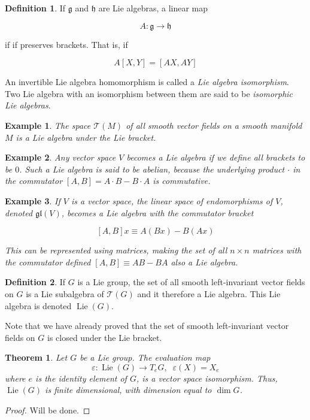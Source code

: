 \documentclass{article}
\DeclareMathOperator{\Lie}{Lie}
\newtheorem{theorem}{Theorem}[section]
\newtheorem{example}{Example}[section]
\theoremstyle{remark}
\theoremstyle{definition}
\newtheorem{definition}{Definition}[section]
\begin{document}
    \begin{definition}
      If $\mathfrak{g}$ and $\mathfrak{h}$ are Lie algebras, a linear map 

        \[A: \mathfrak{g} \longrightarrow \mathfrak{h}\]

      if if preserves brackets. That is, if 

        \[A[X, Y] = [AX, AY]\]

      An invertible Lie algebra homomorphism is called a \textit{Lie algebra isomorphism}. Two Lie algebra with an isomorphism between them are said to be \textit{isomorphic Lie algebras}. 
    \end{definition}

    \begin{example}
      The space $\mathcal{T}(M)$ of all smooth vector fields on a smooth manifold $M$ is a Lie algebra under the Lie bracket. 
    \end{example}

    \begin{example}
      Any vector space $V$ becomes a Lie algebra if we define all brackets to be $0$. Such a Lie algebra is said to be \textit{abelian}, because the underlying product $\cdot$ in the commutator $[A,B] = A \cdot B - B \cdot A$ is commutative. 
    \end{example}

    \begin{example}
      If $V$ is a vector space, the linear space of endomorphisms of $V$, denoted $\mathfrak{gl}(V)$, becomes a Lie algebra with the commutator bracket

        \[[A,B] x \equiv A (Bx) - B (Ax)\]

      This can be represented using matrices, making the set of all $n \times n$ matrices with the commutator defined $[A,B] \equiv A B - B A$ also a Lie algebra. 
    \end{example}

    \begin{definition}
      If $G$ is a Lie group, the set of all smooth left-invariant vector fields on $G$ is a Lie subalgebra of $\mathcal{T}(G)$ and it therefore a Lie algebra. This Lie algebra is denoted $\Lie(G)$.
    \end{definition}

    Note that we have already proved that the set of smooth left-invariant vector fields on $G$ is closed under the Lie bracket. 

    \begin{theorem}
      Let $G$ be a Lie group. The evaluation map 
      \[\varepsilon: \Lie(G) \longrightarrow T_e G, \;\; \varepsilon(X) = X_e \]
      where $e$ is the identity element of $G$, is a vector space isomorphism. Thus, $\Lie(G)$ is finite dimensional, with dimension equal to $\dim{G}$. 
    \end{theorem}
    \begin{proof}
      Will be done. 
    \end{proof}
\end{document}
